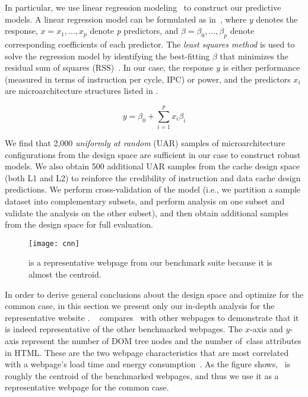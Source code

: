 In particular, we use linear regression modeling~\cite{RMS} to construct our predictive models. A linear regression model can be formulated as in~, where $y$ denotes the response, $x = x_{1},...,x_{p}$ denote \textit{p} predictors, and $\beta = \beta_{0},...,\beta_{p}$ denote corresponding coefficients of each predictor. The \textit{least squares method} is used to solve the regression model by identifying the best-fitting $\beta$ that minimizes the residual sum of squares (RSS)~\cite{ESL}. In our case, the response $y$ is either performance (measured in terms of instruction per cycle, IPC) or power, and the predictors $x_{i}$ are microarchitecture structures listed in .

\begin{equation}
       y = \beta_0 + \sum_{i=1}^{p} x_i \beta_i
\label{equ:linear}
\end{equation}

We find that 2,000 \textit{uniformly at random} (UAR) samples of microarchitecture configurations from the design space are sufficient in our case to construct robust models. We also obtain 500 additional UAR samples from the cache design space (both L1 and L2) to reinforce the credibility of instruction and data cache design predictions. We perform cross-validation of the model (i.e., we partition a sample dataset into complementary subsets, and perform analysis on one subset and validate the analysis on the other subset), and then obtain additional samples from the design space for full evaluation.

\begin{figure}[t]
  \centering
  \texttt{[image: cnn]}
  \caption{ is a representative webpage from our benchmark suite because it is almost the centroid.}
  \label{fig:cnn}
\end{figure}

In order to derive general conclusions about the design space and optimize for the common case, in this section we present only our in-depth analysis for the representative website . ~ compares~ with other webpages to demonstrate that it is indeed representative of the other benchmarked webpages. The $x$-axis and $y$-axis represent the number of DOM tree nodes and the number of~\textsf{class} attributes in HTML. These are the two webpage characteristics that are most correlated with a webpage's load time and energy consumption~\cite{big-little}. As the figure shows,~ is roughly the centroid of the benchmarked webpages, and thus we use it as a representative webpage for the common case.

